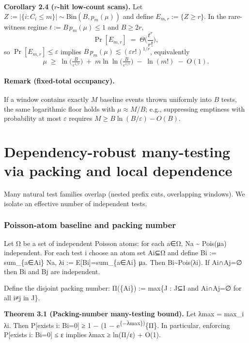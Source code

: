 \documentclass[
 11pt,
]{article}
\begin{document}
\textbf{Corollary 2.4 (\(r\)-hit low-count scans).}
Let \(Z := |\{i: C_i\le m\}|\sim \mathrm{Bin}(B,p_m(\mu))\) and define
\(E_{m,r}:=\{Z\ge r\}\).
In the rare-witness regime \(t:=B\,p_m(\mu)\le 1\) and \(B\ge 2r\),
\[
\Pr[E_{m,r}] \;=\; \Theta\!\Big(\frac{t^r}{r!}\Big),
\]
so \(\Pr[E_{m,r}]\le \varepsilon\) implies \(B\,p_m(\mu)\lesssim (\varepsilon r!)^{1/r}\),
equivalently
\[
\mu \;\ge\; \ln\!\Big(\tfrac{B}{\varepsilon^{1/r}}\Big)
\;+\; m\ln\ln\!\Big(\tfrac{B}{\varepsilon^{1/r}}\Big)
\;-\; \ln(m!) \;-\; O(1).
\]

\paragraph{Remark (fixed-total occupancy).}
If a window contains exactly \(M\) baseline events thrown uniformly into \(B\) tests,
the same logarithmic floor holds with \(\mu \approx M/B\); e.g., suppressing
emptiness with probability at most \(\varepsilon\) requires
\(M \ge B\ln(B/\varepsilon)-O(B)\).
\section{Dependency-robust many-testing via packing and local
dependence}\label{dependency-robust-many-testing-via-packing-and-local-dependence}

Many natural test families overlap (nested prefix cuts, overlapping
windows). We isolate an effective number of independent tests.

\subsubsection{Poisson-atom baseline and packing
number}\label{poisson-atom-baseline-and-packing-number}

Let Ω be a set of independent Poisson atoms: for each a∈Ω, Na
\textasciitilde{} Pois(μa) independent. For each test i choose an atom
set Ai⊆Ω and define Bi := sum\_\{a∈Ai\} Na, λi :=
E{[}Bi{]}=sum\_\{a∈Ai\} μa. Then Bi\textasciitilde Pois(λi). If Ai∩Aj=∅
then Bi and Bj are independent.

Define the disjoint packing number: Π(\{Ai\}) :=
max\{\textbar J\textbar{} : J⊆I and Ai∩Aj=∅ for all i≠j in J\}.

\textbf{Theorem 3.1 (Packing-number many-testing bound).} Let λmax =
max\_i λi. Then P{[}exists i: Bi=0{]} ≥ 1 − (1 −
e\textsuperscript{\{−λmax\})}\{Π\}. In particular, enforcing P{[}exists
i: Bi=0{]} ≤ ε implies λmax ≥ ln(Π/ε) + O(1).
\end{document}
